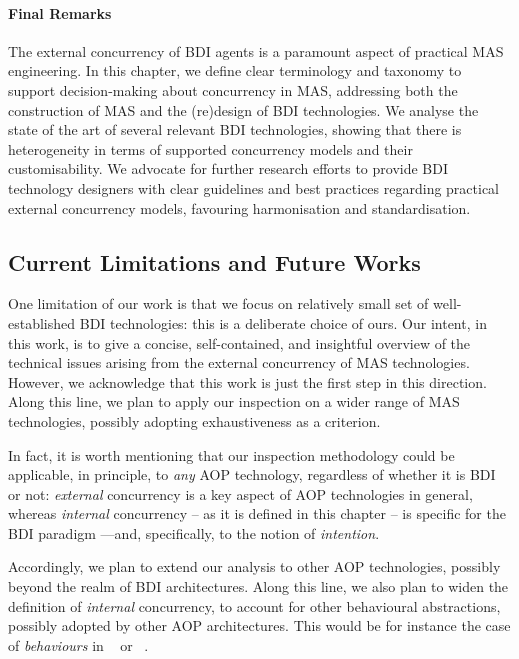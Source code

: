 \paragraph{Final Remarks}

The external concurrency of \ac{BDI} agents is a paramount aspect of practical \ac{MAS} engineering.
%
In this chapter,
we define clear terminology and taxonomy to support decision-making about concurrency in \ac{MAS},
addressing both the construction of \ac{MAS}
and the (re)design of \ac{BDI} technologies.
%
We analyse the state of the art of several relevant \ac{BDI} technologies,
showing that there is heterogeneity in terms of supported concurrency models and their customisability.
%
We advocate for further research efforts
to provide \ac{BDI} technology designers with clear guidelines and best practices
regarding practical external concurrency models,
favouring harmonisation and standardisation.

\subsection{Current Limitations and Future Works}

One limitation of our work is that 
we focus on relatively small set of well-established \ac{BDI} technologies:
this is a deliberate choice of ours.
%
Our intent,
in this work,
is to give a concise, self-contained, and insightful overview of the technical issues
arising from the external concurrency of \ac{MAS} technologies.
%
However,
we acknowledge that this work is just the first step in this direction.
%
Along this line,
we plan to apply our inspection on a wider range of \ac{MAS} technologies,
possibly adopting exhaustiveness as a criterion.

In fact, 
it is worth mentioning that our inspection methodology could be applicable,
in principle,
to \emph{any} \ac{AOP} technology,
regardless of whether it is \ac{BDI} or not:
\emph{external} concurrency is a key aspect of \ac{AOP} technologies in general,
whereas \emph{internal} concurrency 
-- as it is defined in this chapter --
is specific for the \ac{BDI} paradigm%
---and, specifically, to the notion of \emph{intention}.

Accordingly,
we plan to extend our analysis to other \ac{AOP} technologies,
possibly beyond the realm of \ac{BDI} architectures.
%
Along this line,
we also plan to widen the definition of \emph{internal} concurrency,
to account for other behavioural abstractions, 
possibly adopted by other \ac{AOP} architectures.
%
This would be for instance the case of \emph{behaviours} in \jade~\cite{BellifemineCG07} or \spade~\cite{PalancaRCJT22}.

